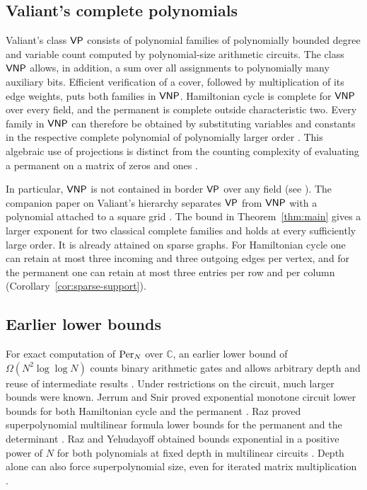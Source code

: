 \subsection{Valiant's complete polynomials}

Valiant's class $\mathsf{VP}$ consists of polynomial families of polynomially
bounded degree and variable count computed by polynomial-size arithmetic
circuits. The class $\mathsf{VNP}$ allows, in addition, a sum over all assignments
to polynomially many auxiliary bits. Efficient verification of a cover,
followed by multiplication of its edge weights, puts both families in
$\mathsf{VNP}$. Hamiltonian cycle is complete for $\mathsf{VNP}$ over every field, and
the permanent is complete outside characteristic two. Every family in
$\mathsf{VNP}$ can therefore be obtained by substituting variables and constants
in the respective complete polynomial of polynomially larger order
\cite{Valiant,ValiantProjections,Burgisser}. This algebraic use of
projections is distinct from the counting complexity of evaluating a
permanent on a matrix of zeros and ones \cite{ValiantPermanent}.

In particular, $\mathsf{VNP}$ is not contained in border $\mathsf{VP}$ over any field
(see \cite[Conjecture~7.5]{BurgisserBorderConjecture}).
The companion paper on Valiant's hierarchy separates $\mathsf{VP}$ from $\mathsf{VNP}$
with a polynomial attached to a square grid \cite{oaH}. The bound in
Theorem~\ref{thm:main} gives a larger exponent for two classical
complete families and holds at every sufficiently large order. It is
already attained on sparse graphs. For Hamiltonian cycle one can retain
at most three incoming and three outgoing edges per vertex, and for the
permanent one can retain at most three entries per row and per column
(Corollary~\ref{cor:sparse-support}).

\subsection{Earlier lower bounds}\label{sec:earlier-bounds}
For exact computation of $\mathrm{Per}_N$ over $\mathbb C$, an earlier lower
bound of $\Omega(N^2\log\log N)$ counts binary arithmetic gates and
allows arbitrary depth and reuse of intermediate results
\cite[Chapter~5, Theorem~1.1]{TenAdvances}.
Under restrictions on the circuit, much larger bounds were known.
Jerrum and Snir proved exponential monotone circuit lower bounds for
both Hamiltonian cycle and the permanent
\cite[Sections~4.3 and~4.4]{jerrumsnir}.
Raz proved superpolynomial multilinear formula lower bounds for the
permanent and the determinant \cite{Raz}. Raz and Yehudayoff obtained
bounds exponential in a positive power of $N$ for both polynomials
at fixed depth in multilinear circuits \cite{RazYehudayoff}.
Depth alone can also force superpolynomial size, even for iterated
matrix multiplication \cite{LST,Forbes,BDS}.

